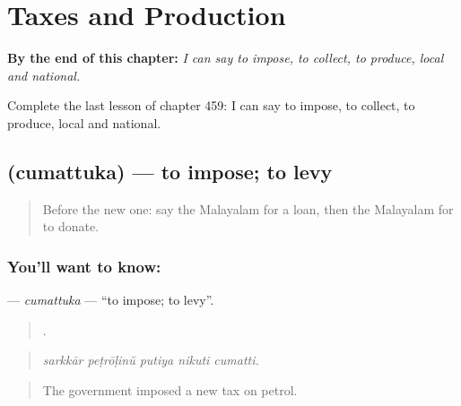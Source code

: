 
\chapter{Taxes and Production}
\label{ch:ml-taxes-and-production}

\begin{chapteropening}
\textbf{By the end of this chapter:} \emph{I can say to impose, to collect, to produce, local and national.}

Complete the last lesson of chapter 459: I can say to impose, to collect, to produce, local and national.
\end{chapteropening}

\section[\texorpdfstring{\ml{ചുമത്തുക} (cumattuka)}{ചുമത്തുക (cumattuka)}]{ (cumattuka) — to impose; to levy}

\label{lesson:ML-C459-cumattuka}



\begin{quote}
Before the new one: say the Malayalam for a loan, then the Malayalam for to donate.
\end{quote}

\subsection*{You'll want to know: }
\textbf{} — \emph{cumattuka} — \textquotedblleft{}to impose; to levy\textquotedblright{}.

\begin{quote}
    .
\end{quote}

\begin{quote}
\emph{sarkkār peṭrōḷinŭ putiya nikuti cumatti.}
\end{quote}

\begin{quote}
The government imposed a new tax on petrol.
\end{quote}

